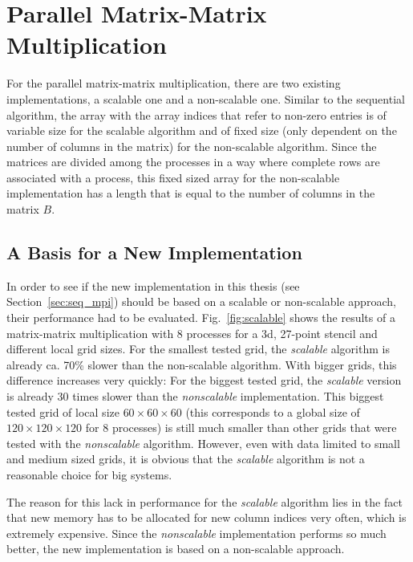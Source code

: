 \section{Parallel Matrix-Matrix Multiplication}
For the parallel matrix-matrix multiplication, there are two existing implementations, a scalable one and a non-scalable one. Similar to the sequential algorithm, the array with the array indices that refer to non-zero entries is of variable size for the scalable algorithm and of fixed size (only dependent on the number of columns in the matrix) for the non-scalable algorithm. Since the matrices are divided among the processes in a way where complete rows are  associated with a process, this fixed sized array for the non-scalable implementation has a length that is equal to the number of columns in the matrix $B$. 

\subsection{A Basis for a New Implementation}
In order to see if the new implementation in this thesis (see Section~\ref{sec:seq_mpi}) should be based on a scalable or non-scalable approach, their performance had to be evaluated. Fig.~\ref{fig:scalable} shows the results of a matrix-matrix multiplication with 8 processes for a 3d, 27-point stencil and different local grid sizes. For the smallest tested grid, the \textit{scalable} algorithm is already ca. 70\% slower than the non-scalable algorithm. With bigger grids, this difference increases very quickly: For the biggest tested grid, the \textit{scalable} version is already 30 times slower than the \textit{nonscalable} implementation. This biggest tested grid of local size $60 \times 60 \times 60$ (this corresponds to a global size of $120\times 120 \times 120$ for 8 processes) is still much smaller than other grids that were tested with the \textit{nonscalable} algorithm. However, even with data limited to small and medium sized grids, it is obvious that the \textit{scalable} algorithm is not a reasonable choice for big systems. 

The reason for this lack in performance for the \textit{scalable} algorithm lies in the fact that new memory has to be allocated for new column indices very often, which is extremely expensive. Since the \textit{nonscalable} implementation performs so much better, the new implementation is based on a non-scalable approach. 

